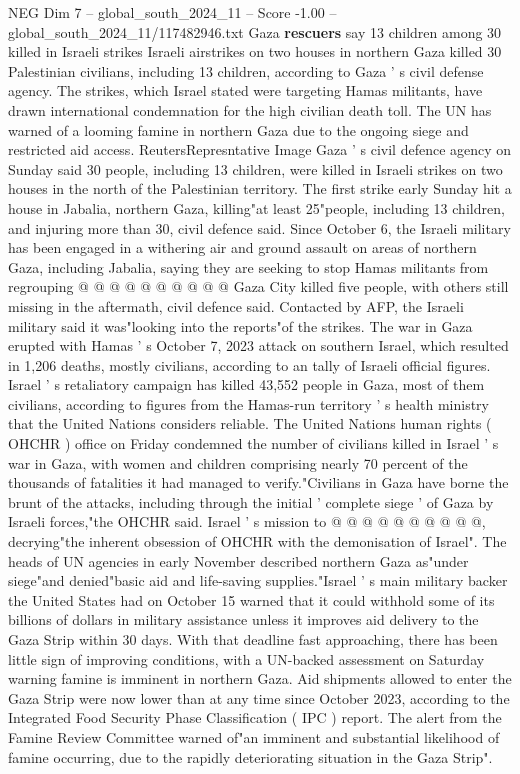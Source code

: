 \begin{textsample}{NEG Dim 7 – global\_south\_2024\_11 – Score -1.00 – global\_south\_2024\_11/117482946.txt}  \label{ex:f7_neg_319}
Gaza \textbf{rescuers} say 13 children among 30 killed in Israeli strikes Israeli airstrikes on two houses in northern Gaza killed 30 Palestinian civilians, including 13 children, according to Gaza ' s civil defense agency.
The strikes, which Israel stated were targeting Hamas militants, have drawn international condemnation for the high civilian death toll.
The UN has warned of a looming famine in northern Gaza due to the ongoing siege and restricted aid access.
ReutersRepresntative Image Gaza ' s civil defence agency on Sunday said 30 people, including 13 children, were killed in Israeli strikes on two houses in the north of the Palestinian territory.
The first strike early Sunday hit a house in Jabalia, northern Gaza, killing"at least 25"people, including 13 children, and injuring more than 30, civil defence said.
Since October 6, the Israeli military has been engaged in a withering air and ground assault on areas of northern Gaza, including Jabalia, saying they are seeking to stop Hamas militants from regrouping @ @ @ @ @ @ @ @ @ @ Gaza City killed five people, with others still missing in the aftermath, civil defence said.
Contacted by AFP, the Israeli military said it was"looking into the reports"of the strikes.
The war in Gaza erupted with Hamas ' s October 7, 2023 attack on southern Israel, which resulted in 1,206 deaths, mostly civilians, according to an tally of Israeli official figures.
Israel ' s retaliatory campaign has killed 43,552 people in Gaza, most of them civilians, according to figures from the Hamas-run territory ' s health ministry that the United Nations considers reliable.
The United Nations human rights ( OHCHR ) office on Friday condemned the number of civilians killed in Israel ' s war in Gaza, with women and children comprising nearly 70 percent of the thousands of fatalities it had managed to verify."Civilians in Gaza have borne the brunt of the attacks, including through the initial ' complete siege ' of Gaza by Israeli forces,"the OHCHR said.
Israel ' s mission to @ @ @ @ @ @ @ @ @ @, decrying"the inherent obsession of OHCHR with the demonisation of Israel".
The heads of UN agencies in early November described northern Gaza as"under siege"and denied"basic aid and life-saving supplies."Israel ' s main military backer the United States had on October 15 warned that it could withhold some of its billions of dollars in military assistance unless it improves aid delivery to the Gaza Strip within 30 days.
With that deadline fast approaching, there has been little sign of improving conditions, with a UN-backed assessment on Saturday warning famine is imminent in northern Gaza.
Aid shipments allowed to enter the Gaza Strip were now lower than at any time since October 2023, according to the Integrated Food Security Phase Classification ( IPC ) report.
The alert from the Famine Review Committee warned of"an imminent and substantial likelihood of famine occurring, due to the rapidly deteriorating situation in the Gaza Strip".

\end{textsample}
